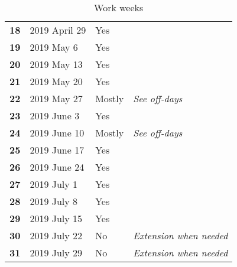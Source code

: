 \begin{table} [h!]
\begin{tabular}{l|lll}
		\rowcolor{Gray}
		\textbf{18} 	& 	2019 April 29		& 	Yes		&  \\
		\textbf{19} 	& 	2019 May 6			& 	Yes		&  \\
		\rowcolor{Gray}
		\textbf{20} 	& 	2019 May 13			& 	Yes		&  \\
		\textbf{21} 	& 	2019 May 20			& 	Yes		&  \\
		\rowcolor{Gray}
		\textbf{22} 	& 	2019 May 27			& 	Mostly	&  \textit{See off-days}\\
		\textbf{23} 	& 	2019 June 3			& 	Yes		&  \\
		\rowcolor{Gray}
		\textbf{24} 	& 	2019 June 10		& 	Mostly	&  \textit{See off-days}\\
		\textbf{25} 	& 	2019 June 17		& 	Yes		&  \\
		\rowcolor{Gray}
		\textbf{26} 	& 	2019 June 24		& 	Yes		&  \\
		\textbf{27} 	& 	2019 July 1			& 	Yes		&  \\
		\rowcolor{Gray}
		\textbf{28} 	& 	2019 July 8			& 	Yes		&  \\
		\textbf{29} 	& 	2019 July 15		& 	Yes		&  \\
		\rowcolor{Gray}
		\textbf{30} 	& 	2019 July 22		& 	No		&  \textit{Extension when needed}\\
		\textbf{31} 	& 	2019 July 29		& 	No		&  \textit{Extension when needed}\\
	\end{tabular}
	\caption{Work weeks}
	\label{tab:workweeks}
\end{table}